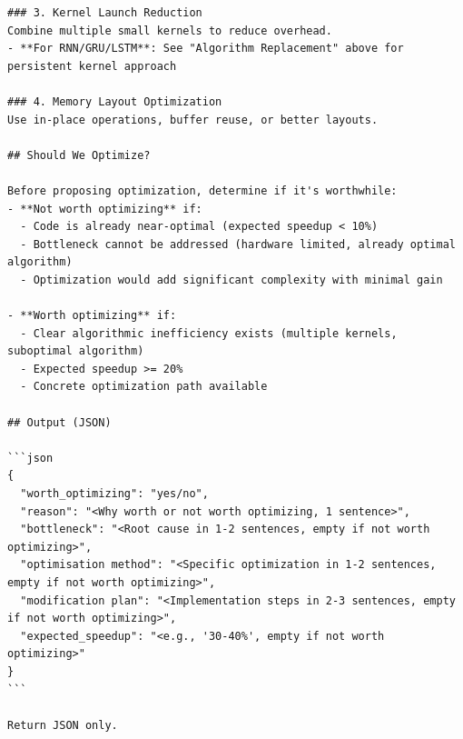 \documentclass{article}
\theoremstyle{plain}
\theoremstyle{definition}
\theoremstyle{remark}
\begin{document}
\begin{mdframed}[linewidth=1pt, linecolor=black, backgroundcolor=gray!5]
\begin{lstlisting}
### 3. Kernel Launch Reduction
Combine multiple small kernels to reduce overhead.
- **For RNN/GRU/LSTM**: See "Algorithm Replacement" above for persistent kernel approach

### 4. Memory Layout Optimization
Use in-place operations, buffer reuse, or better layouts.

## Should We Optimize?

Before proposing optimization, determine if it's worthwhile:
- **Not worth optimizing** if:
  - Code is already near-optimal (expected speedup < 10%)
  - Bottleneck cannot be addressed (hardware limited, already optimal algorithm)
  - Optimization would add significant complexity with minimal gain

- **Worth optimizing** if:
  - Clear algorithmic inefficiency exists (multiple kernels, suboptimal algorithm)
  - Expected speedup >= 20%
  - Concrete optimization path available

## Output (JSON)

```json
{
  "worth_optimizing": "yes/no",
  "reason": "<Why worth or not worth optimizing, 1 sentence>",
  "bottleneck": "<Root cause in 1-2 sentences, empty if not worth optimizing>",
  "optimisation method": "<Specific optimization in 1-2 sentences, empty if not worth optimizing>",
  "modification plan": "<Implementation steps in 2-3 sentences, empty if not worth optimizing>",
  "expected_speedup": "<e.g., '30-40%', empty if not worth optimizing>"
}
```

Return JSON only.
\end{lstlisting}
\end{mdframed}
\end{document}
